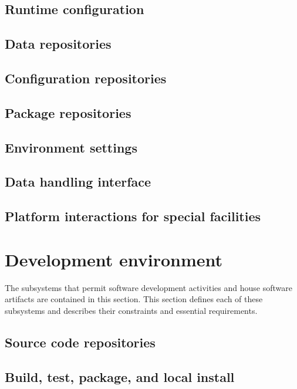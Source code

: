 \documentclass[draftmode,draftwater]{memarticle}
\begin{document}
\subsection{Runtime configuration}

\subsection{Data repositories}

\subsection{Configuration repositories}

\subsection{Package repositories}

\subsection{Environment settings}

\subsection{Data handling interface}

\subsection{Platform interactions for special facilities} 

\section{Development environment}

The subsystems that permit software development activities and house
software artifacts are contained in this section. This section defines
each of these subsystems and describes their constraints and essential
requirements.


\subsection{Source code repositories}

\subsection{Build, test, package, and local install}
\end{document}
